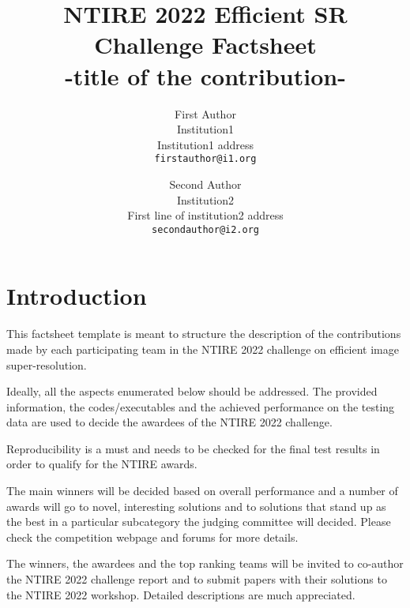 \documentclass[10pt,twocolumn,letterpaper]{article}
\begin{document}
\title{NTIRE 2022 Efficient SR Challenge Factsheet\\-title of the contribution-}

\author{First Author\\
Institution1\\
Institution1 address\\
{\tt\small firstauthor@i1.org}
\and
Second Author\\
Institution2\\
First line of institution2 address\\
{\tt\small secondauthor@i2.org}
}
\maketitle

\section{Introduction}

This factsheet template is meant to structure the description of the contributions made by each participating team in the NTIRE 2022 challenge on efficient image super-resolution. 

Ideally, all the aspects enumerated below should be addressed.
The provided information, the codes/executables and the achieved performance on the testing data are used to decide the awardees of the NTIRE 2022 challenge. 

Reproducibility is a must and needs to be checked for the final test results in order to qualify for the NTIRE awards. 

The main winners will be decided based on overall performance and a number of awards will go to novel, interesting solutions and to solutions that stand up as the best in a particular subcategory the judging committee will decided. Please check the competition webpage and forums for more details.

The winners, the awardees and the top ranking teams will be invited to co-author the NTIRE 2022 challenge report and to submit papers with their solutions to the NTIRE 2022 workshop. Detailed descriptions are much appreciated.
\end{document}
